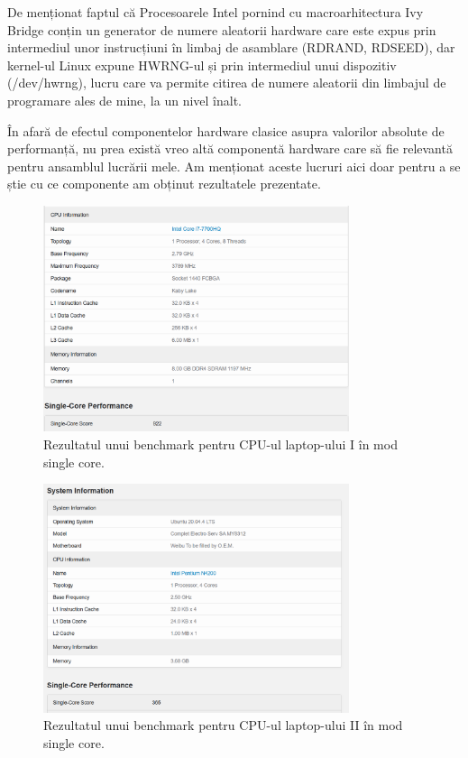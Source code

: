 De menționat faptul că Procesoarele Intel pornind cu macroarhitectura Ivy Bridge conțin un generator de numere aleatorii hardware care este expus prin intermediul unor instrucțiuni în limbaj de asamblare (RDRAND, RDSEED), dar kernel-ul Linux expune HWRNG-ul și prin intermediul unui dispozitiv (/dev/hwrng), lucru care va permite citirea de numere aleatorii din limbajul de programare ales de mine, la un nivel înalt. 


În afară de efectul componentelor hardware clasice asupra valorilor absolute de performanță, nu prea există vreo altă componentă hardware care să fie relevantă pentru ansamblul lucrării mele. Am menționat aceste lucruri aici doar pentru a se știe cu ce componente am obținut rezultatele prezentate.
\begin{figure}[H]
    \centering
    \includegraphics[width=0.8\textwidth]{continut/capitol2/figuri/BenchmarkLenovo.png}
    \caption{Rezultatul unui benchmark pentru CPU-ul laptop-ului I în mod single core.}
    \label{fig:BenchmarkLenovo}
\end{figure}

\begin{figure}[H]
    \centering
    \includegraphics[width=0.8\textwidth]{continut/capitol2/figuri/BenchmarkMyria.png}
    \caption{Rezultatul unui benchmark pentru CPU-ul laptop-ului II în mod single core.}
    \label{fig:BenchmarkMyria}
\end{figure}


